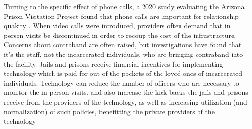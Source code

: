 \documentclass[12pt, a4paper]{article}
\begin{document}
Turning to the specific effect of phone calls, a 2020 study evaluating the Arizona Prison Visitation Project found that phone calls are important for relationship quakity \citep{haverkate_differential_2020}. When video calls were introduced, providers often demand that in person visits be discontinued in order to recoup the cost of the infrastructure. Concerns about contraband are often raised, but investigations have found that it's the staff, not the incarcerated individuals, who are bringing contraband into the facility. Jails and prisons receive financial incentives for implementing technology which is paid for out of the pockets of the loved ones of incarcerated individuals. Technology can reduce the number of officers who are necessary to monitor the in person visits, and also increase the kick backs the jails and prisons receive from the providers of the technology, as well as increasing utilization (and normalization) of such policies, benefitting the private providers of the technology.




\newpage

\end{document}
